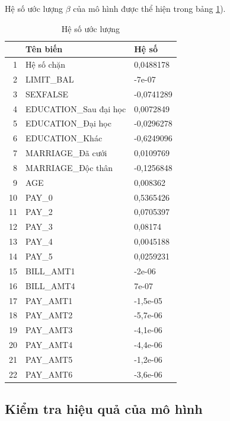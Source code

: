 \documentclass[a4paper]{report}\usepackage[]{graphicx}\usepackage[]{color}
\begin{document}
Hệ số ước lượng $\beta$ của mô hình được thể hiện trong bảng \ref{tab:lasso_final}). 

\begin{table}[ht]
\centering
\begin{tabular}{rll}
  \hline
 & Tên biến & Hệ số \\ 
  \hline
1 & Hệ số chặn & 0,0488178 \\ 
  2 & LIMIT\_BAL & -7e-07 \\ 
  3 & SEXFALSE & -0,0741289 \\ 
  4 & EDUCATION\_Sau đại học & 0,0072849 \\ 
  5 & EDUCATION\_Đại học & -0,0296278 \\ 
  6 & EDUCATION\_Khác & -0,6249096 \\ 
  7 & MARRIAGE\_Đã cưới & 0,0109769 \\ 
  8 & MARRIAGE\_Độc thân & -0,1256848 \\ 
  9 & AGE & 0,008362 \\ 
  10 & PAY\_0 & 0,5365426 \\ 
  11 & PAY\_2 & 0,0705397 \\ 
  12 & PAY\_3 & 0,08174 \\ 
  13 & PAY\_4 & 0,0045188 \\ 
  14 & PAY\_5 & 0,0259231 \\ 
  15 & BILL\_AMT1 & -2e-06 \\ 
  16 & BILL\_AMT4 & 7e-07 \\ 
  17 & PAY\_AMT1 & -1,5e-05 \\ 
  18 & PAY\_AMT2 & -5,7e-06 \\ 
  19 & PAY\_AMT3 & -4,1e-06 \\ 
  20 & PAY\_AMT4 & -4,4e-06 \\ 
  21 & PAY\_AMT5 & -1,2e-06 \\ 
  22 & PAY\_AMT6 & -3,6e-06 \\ 
   \hline
\end{tabular}
\caption{Hệ số ước lượng} 
\label{tab:lasso_final}
\end{table}


\subsection{Kiểm tra hiệu quả của mô hình}
\end{document}

